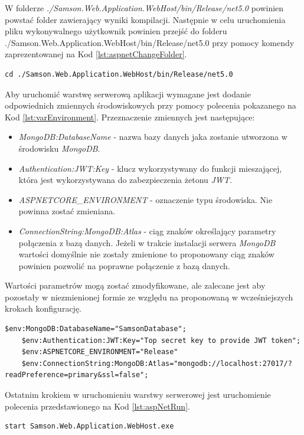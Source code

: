 \documentclass[a4paper,twoside,12pt]{book}
\begin{document}
W folderze \textit{./Samson.Web.Application.WebHost/bin/Release/net5.0} powinien powstać folder zawierający wyniki kompilacji. Następnie w celu uruchomienia pliku wykonywalnego użytkownik powinien przejść do folderu \\ ./Samson.Web.Application.WebHost/bin/Release/net5.0 przy pomocy komendy zaprezentowanej na Kod \ref{lst:aspnetChangeFolder}.
\begin{lstlisting}[caption={Przejście do folderu zawierającego plik wykonywalny}, label={lst:aspnetChangeFolder}]
	cd ./Samson.Web.Application.WebHost/bin/Release/net5.0
\end{lstlisting}

Aby uruchomić warstwę serwerową aplikacji wymagane jest dodanie odpowiednich zmiennych środowiskowych przy pomocy polecenia pokazanego na Kod \ref{lst:varEnvironment}. Przeznaczenie zmiennych jest następujące:
\begin{itemize}
	\item \textit{MongoDB:DatabaseName} - nazwa bazy danych jaka zostanie utworzona w środowisku \textit{MongoDB}.
	\item \textit{Authentication:JWT:Key} - klucz wykorzystywany do funkcji mieszającej, która jest wykorzystywana do zabezpieczenia żetonu \textit{JWT}.
	\item \textit{ASPNETCORE\_ENVIRONMENT} - oznaczenie typu środowiska. Nie powinna zostać zmieniana.
	\item \textit{ConnectionString:MongoDB:Atlas} - ciąg znaków określający parametry połączenia z bazą danych. Jeżeli w trakcie instalacji serwera \textit{MongoDB} wartości domyślnie nie zostały zmienione to proponowany ciąg znaków powinien pozwolić na poprawne połączenie z bazą danych.
\end{itemize}
Wartości parametrów mogą zostać zmodyfikowane, ale zalecane jest aby pozostały w niezmienionej formie ze względu na proponowaną w wcześniejszych krokach konfigurację.
\begin{lstlisting}[caption={Ustawienie wartości zmiennych środowiskowych}, label={lst:varEnvironment}]
	$env:MongoDB:DatabaseName="SamsonDatabase";
	$env:Authentication:JWT:Key="Top secret key to provide JWT token";
	$env:ASPNETCORE_ENVIRONMENT="Release"
	$env:ConnectionString:MongoDB:Atlas="mongodb://localhost:27017/?readPreference=primary&ssl=false";
\end{lstlisting}

Ostatnim krokiem w uruchomieniu warstwy serwerowej jest uruchomienie polecenia przedstawionego na Kod \ref{lst:aspNetRun}.
\begin{lstlisting}[caption={Uruchomienie warstwy serwerowej aplikacji}, label={lst:aspNetRun}]
	start Samson.Web.Application.WebHost.exe
\end{lstlisting}
\end{document}
